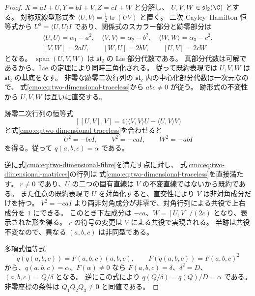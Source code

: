 \begin{proof}
$X=aI+U,Y=bI+V,Z=cI+W$ と分解し、
$U,V,W\in\mathfrak{sl}_2(\C)$ とする。
対称双線型形式を $\langle U,V\rangle=\frac12\operatorname{tr}(UV)$ と置く。
二次 Cayley--Hamilton 恒等式から
$U^2=\langle U,U\rangle I$ であり、関係式のスカラー部分と跡零部分は
\begin{equation}\label{cmo:eq:two-dimensional-traceless}
 \begin{gathered}
 \langle U,U\rangle=\alpha_1-a^2,\quad
 \langle V,V\rangle=\alpha_2-b^2,\quad
 \langle W,W\rangle=\alpha_3-c^2,\\
 [V,W]=2aU,\qquad [W,U]=2bV,\qquad[U,V]=2cW
 \end{gathered}
\end{equation}
となる。
$\operatorname{span}(U,V,W)$ は $\mathfrak{sl}_2$ の Lie 部分代数である。
真部分代数は可解であるから、Lie の定理により同時三角化される。
従って既約表現では $U,V,W$ は $\mathfrak{sl}_2$ の基底をなす。
非零な跡零二次行列の $\mathfrak{sl}_2$ 内の中心化部分代数は一次元なので、
式\eqref{cmo:eq:two-dimensional-traceless}から $abc\ne0$ が従う。
跡形式の不変性から $U,V,W$ は互いに直交する。

跡零二次行列の恒等式
\[
 [[U,V],V]
 =4\bigl(\langle V,V\rangle U-\langle U,V\rangle V\bigr)
\]
と式\eqref{cmo:eq:two-dimensional-traceless}を合わせると
\[
 U^2=-bcI,\qquad V^2=-caI,\qquad W^2=-abI
\]
を得る。従って $q(a,b,c)=\alpha$ である。

逆に式\eqref{cmo:eq:two-dimensional-fibre}を満たす点に対し、
式\eqref{cmo:eq:two-dimensional-matrices}の行列は
式\eqref{cmo:eq:two-dimensional-traceless}を直接満たす。
$r\ne0$ であり、$U$ の二つの固有直線は $V$ の不変直線ではないから既約である。
また任意の既約表現で $U$ を対角化すると、直交性により $V$ は非対角成分だけを持つ。
$V^2=-caI$ より両非対角成分が非零で、対角行列による共役で上右成分を $1$ にできる。
このとき下左成分は $-ca$、$W=[U,V]/(2c)$ となり、表示された形を得る。
$r$ の符号の変更は $V$ による共役で実現される。
半跡は共役不変なので、異なる $(a,b,c)$ は非同型である。

多項式恒等式
\begin{equation}\label{cmo:eq:quadratic-involution}
 q(q(a,b,c))=F(a,b,c)(a,b,c),\qquad
 F(q(a,b,c))=F(a,b,c)^2
\end{equation}
から、$q(a,b,c)=\alpha$、$F(\alpha)\ne0$ なら
$F(a,b,c)=\delta$、$\delta^2=D$、$(a,b,c)=Q/\delta$ となる。
逆にこの式により $q(Q/\delta)=q(Q)/D=\alpha$ である。
非零座標の条件は $Q_1Q_2Q_3\ne0$ と同値である。
\end{proof}

